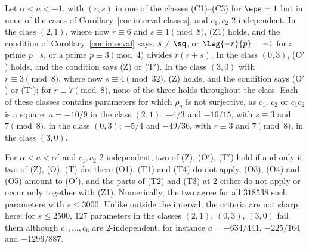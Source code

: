\begin{remark}
  \label{rem:interval}
  Let $\alpha < a < -1$, with $(r, s)$ in one of the classes (C1)--(C3) for $\eps = 1$ but in none
  of the cases of Corollary~\ref{cor:interval-classes}, and $c_1, c_2$ $2$-independent. In the
  class $(2,1)$, where now $r \equiv 6$ and $s \equiv 1 \pmod 8$, (Z1) holds, and the condition of
  Corollary~\ref{cor:interval} says: $s \ne \sq$, or $\Leg{-r}{p} = -1$ for a prime $p \mid s$, or
  a prime $p \equiv 3 \pmod 4$ divides $r(r + s)$. In the class $(0,3)$, (O$'$) holds, and the
  condition says (Z) or (T$'$). In the class $(3,0)$ with $r \equiv 3 \pmod 8$, where now
  $s \equiv 4 \pmod{32}$, (Z) holds, and the condition says (O$'$) or (T$'$); for
  $r \equiv 7 \pmod 8$, none of the three holds throughout the class. Each of these classes
  contains parameters for which $\rho_a$ is not surjective, as $c_1$, $c_2$ or $c_1 c_2$ is a
  square: $a = -10/9$ in the class $(2,1)$; $-4/3$ and $-16/15$, with $s \equiv 3$ and
  $7 \pmod 8$, in the class $(0,3)$; $-5/4$ and $-49/36$, with $r \equiv 3$ and $7 \pmod 8$, in
  the class $(3,0)$.

  For $\alpha < a < \alpha'$ and $c_1, c_2$ $2$-independent, two of (Z), (O$'$), (T$'$) hold if and
  only if two of (Z), (O), (T) do: there (O1), (T1) and (T4) do not apply, (O3), (O4) and (O5)
  amount to (O$'$), and the parts of (T2) and (T3) at $2$ either do not apply or occur only
  together with (Z1). Numerically, the two agree for all $318538$ such parameters with
  $s \le 3000$. Unlike outside the interval, the criteria are not sharp here: for $s \le 2500$,
  $127$ parameters in the classes $(2,1)$, $(0,3)$, $(3,0)$ fail them although
  $c_1, \dots, c_6$ are $2$-independent, for instance $a = -634/441$, $-225/164$ and $-1296/887$.
\end{remark}


